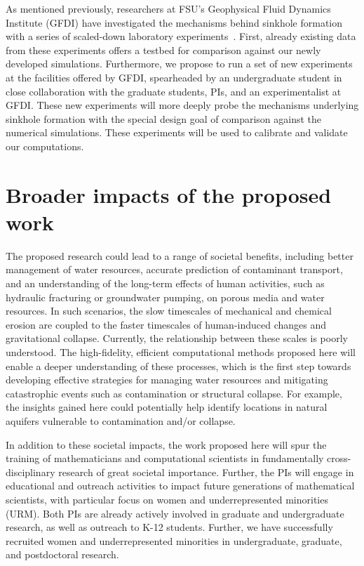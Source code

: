 \documentclass[11pt]{article}
\begin{document}
As mentioned previously, researchers at FSU's Geophysical Fluid Dynamics Institute (GFDI) have investigated the mechanisms behind sinkhole formation with a series of scaled-down laboratory experiments~\cite{tao2014experimental}. First, already existing data from these experiments offers a testbed for comparison against our newly developed simulations. Furthermore, we propose to run a set of new experiments at the facilities offered by GFDI, spearheaded by an undergraduate student in close collaboration with the graduate students, PIs, and an experimentalist at GFDI. These new experiments will more deeply probe the mechanisms underlying sinkhole formation with the special design goal of comparison against the numerical simulations. These experiments will be used to calibrate and validate our computations.


\section{Broader impacts of the proposed work}

The proposed research could lead to a range of societal benefits, including better management of water resources, accurate prediction of contaminant transport, and an understanding of the long-term effects of human activities, such as hydraulic fracturing or groundwater pumping, on porous media and water resources. In such scenarios, the slow timescales of mechanical and chemical erosion are coupled to the faster timescales of human-induced changes and gravitational collapse. Currently, the relationship between these scales is poorly understood. The high-fidelity, efficient computational methods proposed here will enable a deeper understanding of these processes, which is the first step towards developing effective strategies for managing water resources and mitigating catastrophic events such as contamination or structural collapse. For example, the insights gained here could potentially help identify locations in natural aquifers vulnerable to contamination and/or collapse.

In addition to these societal impacts, the work proposed here will spur the training of mathematicians and computational scientists in fundamentally cross-disciplinary research of great societal importance. Further, the PIs will engage in educational and outreach activities to impact future generations of mathematical scientists, with particular focus on women and underrepresented minorities (URM). Both PIs are already actively involved in graduate and undergraduate research, as well as outreach to K-12 students. Further, we have successfully recruited women and underrepresented minorities in undergraduate, graduate, and postdoctoral research.  
\end{document}
